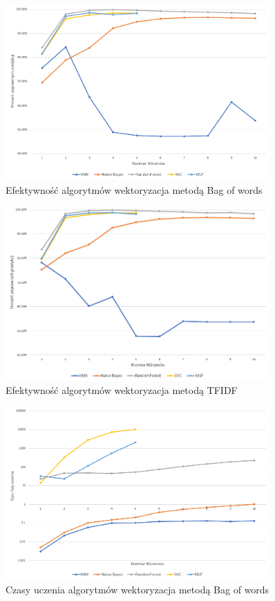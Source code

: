 \begin{figure}[h!]
    \centering
    \includegraphics[width=0.9\textwidth]{./Img/BOWAcc.png}
    \caption{Efektywność algorytmów wektoryzacja metodą Bag of words}
\end{figure}

\begin{figure}[h!]
    \centering
    \includegraphics[width=0.9\textwidth]{./Img/TFIDFAcc.png}
    \caption{Efektywność algorytmów wektoryzacja metodą TFIDF}
\end{figure}

\begin{figure}[h!]
    \centering
    \includegraphics[width=0.9\textwidth]{./Img/BOWLearn.png}
    \caption{Czasy uczenia algorytmów wektoryzacja metodą Bag of words}
\end{figure}

